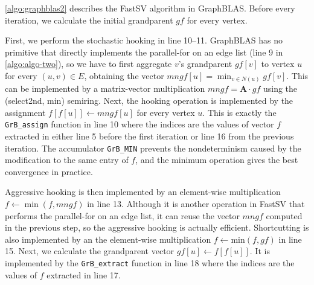 \documentclass{sokendai_thesis} %
\begin{document}
\autoref{algo:graphblas2} describes the  FastSV algorithm in GraphBLAS.
Before every iteration, we calculate the initial grandparent $\mathit{gf}$ for every vertex.

First, we perform the stochastic hooking in line 10--11.
GraphBLAS has no primitive that directly implements the parallel-for on an edge list (line 9 in \autoref{algo:algo-two}), so we have to first aggregate $v$'s grandparent $\mathit{gf}[v]$ to vertex $u$ for every $(u,v)\in E$, obtaining the vector $\mathit{mngf}[u]=\min_{v\in N(u)}\mathit{gf}[v]$.
This can be implemented by a matrix-vector multiplication $\mathit{mngf}=\textbf{A}\cdot\mathit{gf}$ using the (select2nd, min) semiring.
Next, the hooking operation is implemented by the assignment $f[f[u]]\leftarrow \mathit{mngf}[u]$ for every vertex $u$.
This is exactly the \texttt{GrB\_assign} function in line 10 where the indices are the values of vector $f$ extracted in either line 5 before the first iteration or line 16 from the previous iteration.
The accumulator \texttt{GrB\_MIN} prevents the nondeterminism caused by the modification to the same entry of $f$, and the minimum operation gives the best convergence in practice.

Aggressive hooking is then implemented by an element-wise multiplication $f\leftarrow \min(f,\mathit{mngf})$ in line 13.
Although it is another operation in FastSV that performs the parallel-for on an edge list, it can reuse the vector $\mathit{mngf}$ computed in the previous step, so the aggressive hooking is actually efficient.
Shortcutting is also implemented by an the element-wise multiplication $f\leftarrow \text{min}(f,\mathit{gf})$ in line 15.
Next, we calculate the grandparent vector $\mathit{gf}[u]\leftarrow{f[f[u]]}$.
It is implemented by the \texttt{GrB\_extract} function in line 18 where the indices are the values of $f$ extracted in line 17.

\end{document}
